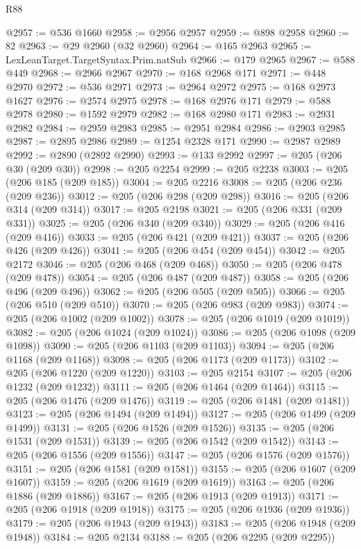 \begin{lexlean}{R88}
\begin{coremodule}
@2957 := @536 @1660
@2958 := @2956 @2957
@2959 := @898 @2958
@2960 := 82
@2963 := @29 @2960 (@32 @2960)
@2964 := @165 @2963
@2965 := LexLeanTarget.TargetSyntax.Prim.natSub
@2966 := @179 @2965
@2967 := @588 @449
@2968 := @2966 @2967
@2970 := @168 @2968 @171
@2971 := @448 @2970
@2972 := @536 @2971
@2973 := @2964 @2972
@2975 := @168 @2973 @1627
@2976 := @2574 @2975
@2978 := @168 @2976 @171
@2979 := @588 @2978
@2980 := @1592 @2979
@2982 := @168 @2980 @171
@2983 := @2931 @2982
@2984 := @2959 @2983
@2985 := @2951 @2984
@2986 := @2903 @2985
@2987 := @2895 @2986
@2989 := @1254 @2328 @171
@2990 := @2987 @2989
@2992 := @2890 (@2892 @2990)
@2993 := @133 @2992
@2997 := @205 (@206 @30 (@209 @30))
@2998 := @205 @2254
@2999 := @205 @2238
@3003 := @205 (@206 @185 (@209 @185))
@3004 := @205 @2216
@3008 := @205 (@206 @236 (@209 @236))
@3012 := @205 (@206 @298 (@209 @298))
@3016 := @205 (@206 @314 (@209 @314))
@3017 := @205 @2198
@3021 := @205 (@206 @331 (@209 @331))
@3025 := @205 (@206 @340 (@209 @340))
@3029 := @205 (@206 @416 (@209 @416))
@3033 := @205 (@206 @421 (@209 @421))
@3037 := @205 (@206 @426 (@209 @426))
@3041 := @205 (@206 @454 (@209 @454))
@3042 := @205 @2172
@3046 := @205 (@206 @468 (@209 @468))
@3050 := @205 (@206 @478 (@209 @478))
@3054 := @205 (@206 @487 (@209 @487))
@3058 := @205 (@206 @496 (@209 @496))
@3062 := @205 (@206 @505 (@209 @505))
@3066 := @205 (@206 @510 (@209 @510))
@3070 := @205 (@206 @983 (@209 @983))
@3074 := @205 (@206 @1002 (@209 @1002))
@3078 := @205 (@206 @1019 (@209 @1019))
@3082 := @205 (@206 @1024 (@209 @1024))
@3086 := @205 (@206 @1098 (@209 @1098))
@3090 := @205 (@206 @1103 (@209 @1103))
@3094 := @205 (@206 @1168 (@209 @1168))
@3098 := @205 (@206 @1173 (@209 @1173))
@3102 := @205 (@206 @1220 (@209 @1220))
@3103 := @205 @2154
@3107 := @205 (@206 @1232 (@209 @1232))
@3111 := @205 (@206 @1464 (@209 @1464))
@3115 := @205 (@206 @1476 (@209 @1476))
@3119 := @205 (@206 @1481 (@209 @1481))
@3123 := @205 (@206 @1494 (@209 @1494))
@3127 := @205 (@206 @1499 (@209 @1499))
@3131 := @205 (@206 @1526 (@209 @1526))
@3135 := @205 (@206 @1531 (@209 @1531))
@3139 := @205 (@206 @1542 (@209 @1542))
@3143 := @205 (@206 @1556 (@209 @1556))
@3147 := @205 (@206 @1576 (@209 @1576))
@3151 := @205 (@206 @1581 (@209 @1581))
@3155 := @205 (@206 @1607 (@209 @1607))
@3159 := @205 (@206 @1619 (@209 @1619))
@3163 := @205 (@206 @1886 (@209 @1886))
@3167 := @205 (@206 @1913 (@209 @1913))
@3171 := @205 (@206 @1918 (@209 @1918))
@3175 := @205 (@206 @1936 (@209 @1936))
@3179 := @205 (@206 @1943 (@209 @1943))
@3183 := @205 (@206 @1948 (@209 @1948))
@3184 := @205 @2134
@3188 := @205 (@206 @2295 (@209 @2295))

\end{coremodule}
\end{lexlean}
